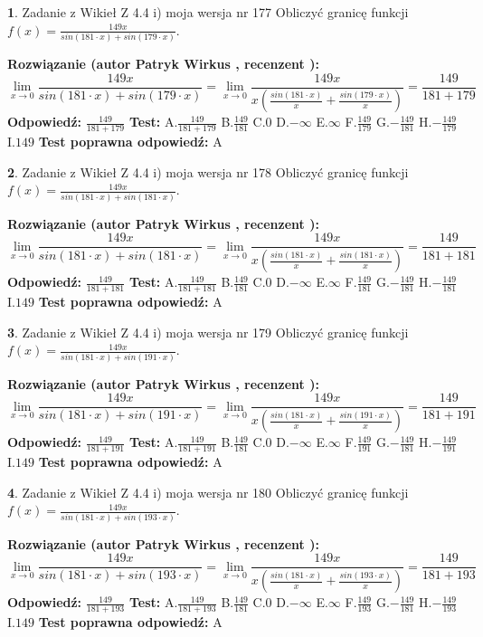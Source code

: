 \documentclass[12pt, a4paper]{article}
\theoremstyle{definition} %
\newtheorem{zad}{}
\newcommand{\zadStart}[1]{\begin{zad}#1\newline}
\newcommand{\zadStop}{\end{zad}}
\newcommand{\rozwStart}[2]{\noindent \textbf{Rozwiązanie (autor #1 , recenzent #2): }\newline}
\newcommand{\rozwStop}{\newline}
\newcommand{\odpStart}{\noindent \textbf{Odpowiedź:}\newline}
\newcommand{\odpStop}{\newline}
\newcommand{\testStart}{\noindent \textbf{Test:}\newline}
\newcommand{\testStop}{\newline}
\newcommand{\kluczStart}{\noindent \textbf{Test poprawna odpowiedź:}\newline}
\newcommand{\kluczStop}{\newline}
\begin{document}
\zadStart{Zadanie z Wikieł Z 4.4 i) moja wersja nr 177}
Obliczyć granicę funkcji $f(x)=\frac{149x}{sin(181\cdot x) +sin(179\cdot x)}$.
\zadStop
\rozwStart{Patryk Wirkus}{}
$$\lim\limits_{x\to 0}\frac{149x}{sin(181\cdot x) +sin(179\cdot x)}=\lim\limits_{x\to 0}\frac{149x}{x(\frac{sin(181\cdot x)}{x}+\frac{sin(179\cdot x)}{x})}=\frac{149}{181+179}$$
\rozwStop
\odpStart
$\frac{149}{181+179}$
\odpStop
\testStart
A.$\frac{149}{181+179}$
B.$\frac{149}{181}$
C.$0$
D.$-\infty$
E.$\infty$
F.$\frac{149}{179}$
G.$-\frac{149}{181}$
H.$-\frac{149}{179}$
I.$149$
\testStop
\kluczStart
A
\kluczStop



\zadStart{Zadanie z Wikieł Z 4.4 i) moja wersja nr 178}
Obliczyć granicę funkcji $f(x)=\frac{149x}{sin(181\cdot x) +sin(181\cdot x)}$.
\zadStop
\rozwStart{Patryk Wirkus}{}
$$\lim\limits_{x\to 0}\frac{149x}{sin(181\cdot x) +sin(181\cdot x)}=\lim\limits_{x\to 0}\frac{149x}{x(\frac{sin(181\cdot x)}{x}+\frac{sin(181\cdot x)}{x})}=\frac{149}{181+181}$$
\rozwStop
\odpStart
$\frac{149}{181+181}$
\odpStop
\testStart
A.$\frac{149}{181+181}$
B.$\frac{149}{181}$
C.$0$
D.$-\infty$
E.$\infty$
F.$\frac{149}{181}$
G.$-\frac{149}{181}$
H.$-\frac{149}{181}$
I.$149$
\testStop
\kluczStart
A
\kluczStop



\zadStart{Zadanie z Wikieł Z 4.4 i) moja wersja nr 179}
Obliczyć granicę funkcji $f(x)=\frac{149x}{sin(181\cdot x) +sin(191\cdot x)}$.
\zadStop
\rozwStart{Patryk Wirkus}{}
$$\lim\limits_{x\to 0}\frac{149x}{sin(181\cdot x) +sin(191\cdot x)}=\lim\limits_{x\to 0}\frac{149x}{x(\frac{sin(181\cdot x)}{x}+\frac{sin(191\cdot x)}{x})}=\frac{149}{181+191}$$
\rozwStop
\odpStart
$\frac{149}{181+191}$
\odpStop
\testStart
A.$\frac{149}{181+191}$
B.$\frac{149}{181}$
C.$0$
D.$-\infty$
E.$\infty$
F.$\frac{149}{191}$
G.$-\frac{149}{181}$
H.$-\frac{149}{191}$
I.$149$
\testStop
\kluczStart
A
\kluczStop



\zadStart{Zadanie z Wikieł Z 4.4 i) moja wersja nr 180}
Obliczyć granicę funkcji $f(x)=\frac{149x}{sin(181\cdot x) +sin(193\cdot x)}$.
\zadStop
\rozwStart{Patryk Wirkus}{}
$$\lim\limits_{x\to 0}\frac{149x}{sin(181\cdot x) +sin(193\cdot x)}=\lim\limits_{x\to 0}\frac{149x}{x(\frac{sin(181\cdot x)}{x}+\frac{sin(193\cdot x)}{x})}=\frac{149}{181+193}$$
\rozwStop
\odpStart
$\frac{149}{181+193}$
\odpStop
\testStart
A.$\frac{149}{181+193}$
B.$\frac{149}{181}$
C.$0$
D.$-\infty$
E.$\infty$
F.$\frac{149}{193}$
G.$-\frac{149}{181}$
H.$-\frac{149}{193}$
I.$149$
\testStop
\kluczStart
A
\kluczStop
\end{document}
